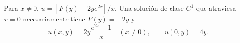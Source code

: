 Para $x\ne0$, $u=[F(y)+2ye^{2x}]/x$. Una solución de clase $C^1$ que atraviesa $x=0$ necesariamente tiene $F(y)=-2y$ y \[u(x,y)=2y\frac{e^{2x}-1}{x}\quad(x\ne0),\qquad u(0,y)=4y.\]
